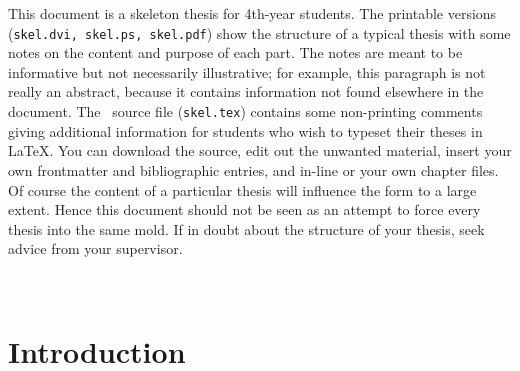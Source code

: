 \documentclass[12pt,openany,a4paper]{book}
\begin{document}

This document is a skeleton thesis for 4th-year students.  The
printable versions (\texttt{skel.dvi, skel.ps, skel.pdf})
show the structure of a typical thesis with some notes on the content
and purpose of each part.  The notes are meant to be informative but
not necessarily illustrative; for example, this paragraph is not
really an abstract, because it contains information not found
elsewhere in the document.  The \LaTeXe\ source file
(\texttt{skel.tex}) contains some non-printing comments giving
additional information for students who wish to typeset their theses
in \LaTeX.  You can download the source, edit out the unwanted
material, insert your own frontmatter and bibliographic entries, and
in-line or \verb++ your own chapter files.  Of course the
content of a particular thesis will influence the form to a large
extent.  Hence this document should not be seen as an attempt to force
every thesis into the same mold.  If in doubt about the structure of
your thesis, seek advice from your supervisor.

\tableofcontents

\listoffigures
{}


% 

\newpage
\verb+ +
 
\cleardoublepage

\mainmatter


%
%
%
%	
%	

\chapter{Introduction}
\end{document}
